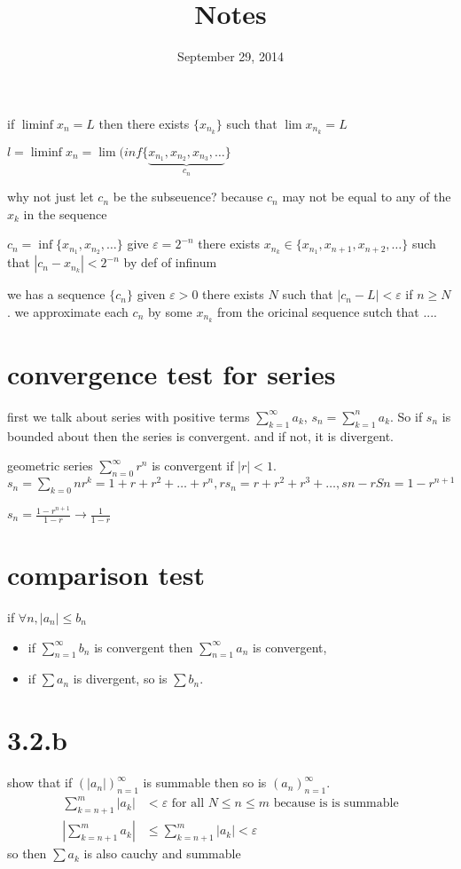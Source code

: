 \documentclass[letterpaper]{article}
\begin{document}
\title{Notes}
\date{September 29, 2014}
\maketitle
if $\liminf x_n=L$ then there exists $\{x_{n_k}\}$ such that $\lim x_{n_k}=L$

$l=\liminf x_n=\lim(inf\{\underbrace{x_{n_1},x_{n_2},x_{n_3},\dots}_{c_n}\}$

why not just let $c_n$ be the subseuence? because $c_n$ may not be equal to any of the $x_k$ in the sequence

$c_n=\inf\{x_{n_1},x_{n_2},\dots\}$ give $\varepsilon=2^{-n}$ there exists $x_{n_k}\in\{x_{n_1},x_{n+1},x_{n+2},\dots\}$ such that $\left\lvert c_n-x_{n_k}\right\rvert<2^{-n}$ by def of infinum

we has a sequence $\{c_n\}$ given $\varepsilon>0$ there exists $N$ such that $\left\lvert c_n-L\right\rvert<\varepsilon$ if $n\ge N$. we approximate each $c_n$ by some $x_{n_k}$ from the oricinal sequence sutch that ....

\section*{convergence test for series}
first we talk about series with positive terms $\sum\limits_{k=1}^\infty{a_k}$, $s_n=\sum\limits_{k=1}^n{a_k}$. So if $s_n$ is bounded about then the series is convergent. and if not, it is divergent.

geometric series $\sum\limits_{n=0}^\infty{r^n}$ is convergent if $\left\lvert r\right\rvert<1$. $s_n=\sum\limits_{k=0}n{r^k}=1+r+r^2+\dots+r^n, rs_n=r+r^2+r^3+\dots, sn-rSn=1-r^{n+1}$

$s_n=\frac{1-r^{n+1}}{1-r}\to\frac{1}{1-r}$


\section*{comparison test}
if $\forall n, |a_n|\le b_n$
\begin{itemize}
\item
  if $\sum\limits_{n=1}^\infty{b_n}$ is convergent then $\sum\limits_{n=1}^\infty{a_n}$ is convergent,
  \item
  if $\sum\limits{a_n}$ is divergent, so is $\sum\limits{b_n}$.
\end{itemize}
\section*{3.2.b}
show that if $\left(|a_n|\right)_{n=1}^\infty$ is summable then so is $\left(a_n\right)_{n=1}^\infty$.
\begin{align*}
  \sum\limits_{k=n+1}^m{|a_k|}&<\varepsilon\text{ for all }N\le n\le m \text{ because is is summable}\\
  \left\lvert\sum\limits_{k=n+1}^m{a_k}\right\rvert&\le\sum\limits_{k=n+1}^m{|a_k|}<\varepsilon
\end{align*}
so then $\sum\limits{a_k}$ is also cauchy and summable
\end{document}
